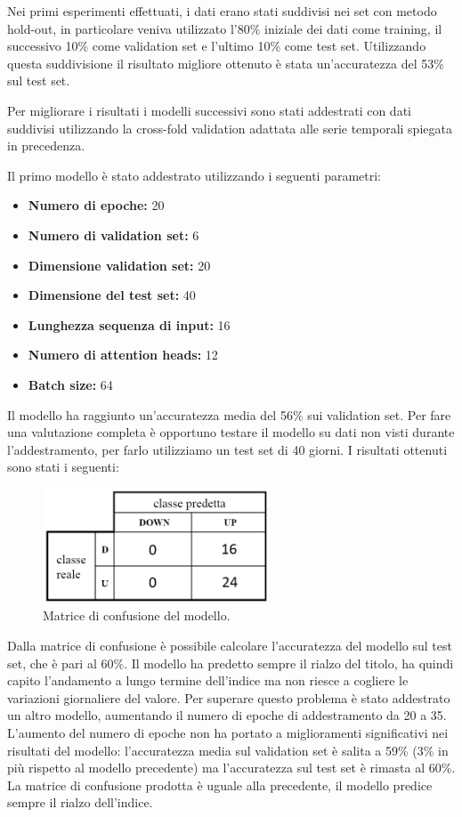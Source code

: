 \documentclass[12pt,a4paper,twoside,openright]{book}
\begin{document}
Nei primi esperimenti effettuati, i dati erano stati suddivisi nei set con metodo hold-out, in particolare veniva utilizzato l'80\% iniziale dei dati come training, il successivo 10\% come validation set e l'ultimo 10\% come test set. Utilizzando questa suddivisione il risultato migliore ottenuto è stata un'accuratezza del 53\% sul test set. 

Per migliorare i risultati i modelli successivi sono stati addestrati con dati suddivisi utilizzando la cross-fold validation adattata alle serie temporali spiegata in precedenza.

Il primo modello è stato addestrato utilizzando i seguenti parametri:
\begin{itemize}
    \item \textbf{Numero di epoche:} 20
    \item \textbf{Numero di validation set:} 6
    \item \textbf{Dimensione validation set:} 20
    \item \textbf{Dimensione del test set:} 40
    \item \textbf{Lunghezza sequenza di input:} 16
    \item \textbf{Numero di attention heads:} 12
    \item \textbf{Batch size:} 64
\end{itemize}

Il modello ha raggiunto un'accuratezza media del 56\% sui validation set. Per fare una valutazione completa è opportuno testare il modello su dati non visti durante l'addestramento, per farlo utilizziamo un test set di 40 giorni. 
I risultati ottenuti sono stati i seguenti:

\begin{figure}[H]
\centering
\includegraphics[width=0.6\textwidth]{images/test_1.png}
\caption{Matrice di confusione del modello.}
\label{fig:rapp_file}
\end{figure}

Dalla matrice di confusione è possibile calcolare l'accuratezza del modello sul test set, che è pari al 60\%.
Il modello ha predetto sempre il rialzo del titolo, ha quindi capito l'andamento a lungo termine dell'indice ma non riesce a cogliere le variazioni giornaliere del valore. 
Per superare questo problema è stato addestrato un altro modello, aumentando il numero di epoche di addestramento da 20 a 35.
L'aumento del numero di epoche non ha portato a miglioramenti significativi nei risultati del modello: l'accuratezza media sul validation set è salita a 59\% (3\% in più rispetto al modello precedente) ma l'accuratezza sul test set è rimasta al 60\%.
La matrice di confusione prodotta è uguale alla precedente, il modello predice sempre il rialzo dell'indice.
\end{document}
